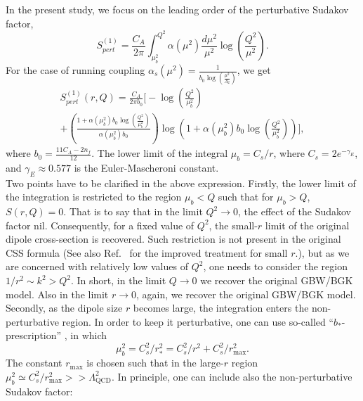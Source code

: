 \documentclass[11pt]{article}
\begin{document}
In the present study, we focus on the leading order of the perturbative Sudakov factor\cite{xiao2017},
\begin{equation}
S^{(1)}_{pert}=\frac{C_A }{2 \pi} \int^{Q^2}_{\mu_b^2  } \alpha(\mu^2 )\frac{d \mu^2}{\mu^2}  \log\left(\frac{Q^2}{\mu^2}\right).
\end{equation}
For the case of running coupling $\alpha_s(\mu^2)=\frac{1}{b_0 \log\left(\frac{\mu^2}{\Lambda_2}\right) }$, we get
\begin{multline}
S^{(1)}_{pert}(r,Q) =\frac{C_A}{2 \pi b_0} \Big[-\log\left(\frac{Q^2}{\mu^2_b}\right) \\+\left(\frac{1+\alpha(\mu_b^2)  b_0 \log \left(\frac{Q^2}{\mu_b^2}\right) }{\alpha(\mu_b^2)   b_0}\right) \log\left( 1+\alpha(\mu_b^2)   b_0 \log \left(\frac{Q^2}{\mu_b^2}\right) \right) \Big],
\label{eq:sudakov}
\end{multline}
where $b_0=\frac{11 C_A-2 n_f}{12}$.
The lower limit of the integral $\mu_b=C_s/r$, where $C_s=2e^{-\gamma_E}$, and $\gamma_E \approx 0.577$ is the Euler-Mascheroni constant.\\
Two points have to be clarified in the above expression.
Firstly, the lower limit of the integration is restricted to the region $\mu_b<Q$ such that for $\mu_b>Q$, $S(r,Q)=0$. That is to say that in the limit $Q^2\rightarrow0$, the effect of the Sudakov factor nil. Consequently, for a fixed value of $Q^2$, the small-$r$ limit of the original dipole cross-section is recovered.   Such restriction is not present in the original CSS formula\cite{css1985} (See also Ref.~\cite{collins2016} for the improved treatment for small $r$.), but as we are concerned with relatively low values of $Q^2$, one needs to consider the region $1/r^2\sim k^2 >Q^2$.
In short, in the limit $Q\rightarrow 0$ we recover the original GBW/BGK model. Also in the limit $r \rightarrow 0$, again,  we recover the original GBW/BGK model.
Secondly, as the dipole size $r$ becomes large, the integration enters the non-perturbative region. In order to keep it perturbative, one can use so-called ``$b_*$-prescription'' \cite{css1985}, in which 
\begin{equation}
\mu_b^2=C_s^2/r_*^2= C_s^2/r^2+C_s^2/r_{\mathrm{max}}^2.
\end{equation}
The constant $r_{\mathrm{max}}$ is chosen such that in the large-$r$ region $\mu_b^2\simeq C_s^2/r_{\mathrm{max}}^2>>\Lambda_{\mathrm{QCD}}^2$.
In principle, one can include also the non-perturbative Sudakov factor\cite{css1985, prokudin2015}:
\end{document}
